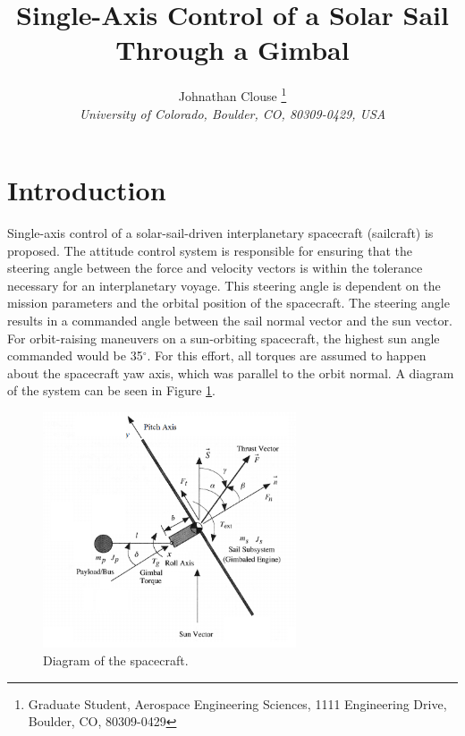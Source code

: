 \documentclass[]{aiaa-tc}%
\title{Single-Axis Control of a Solar Sail Through a Gimbal}
\author{
	Johnathan Clouse%
	\thanks{Graduate Student, Aerospace Engineering Sciences, 1111 Engineering Drive, Boulder, CO, 80309-0429}\\
	{\normalsize\itshape
		University of Colorado, Boulder, CO, 80309-0429, USA}
}
\begin{document}
	

	
	\maketitle
	
	\begin{abstract}
		\noindent 
		
	\end{abstract}
	
	\newpage
	
	\tableofcontents
	
	\newpage

	\section{Introduction}
Single-axis control of a solar-sail-driven interplanetary spacecraft (sailcraft) is proposed.  The attitude control system is responsible for ensuring that the steering angle between the force and velocity vectors is within the tolerance necessary for an interplanetary voyage.  This steering angle is dependent on the mission parameters and the orbital position of the spacecraft. The steering angle results in a commanded angle between the sail normal vector and the sun vector. For orbit-raising maneuvers on a sun-orbiting spacecraft, the highest sun angle commanded would be 35$^{\circ}$\cite{McInnes}. For this effort, all torques are assumed to happen about the spacecraft yaw axis, which was parallel to the orbit normal. A diagram of the system can be seen in Figure \ref{fig:Diagram}.
	
	\begin{figure}[H]
		\centering
			\includegraphics[width = 7.5cm]{schematic.png}
		\caption{Diagram of the spacecraft\cite{WieSolarSail2}. }
		\label{fig:Diagram}
	\end{figure}	
	
\end{document}

